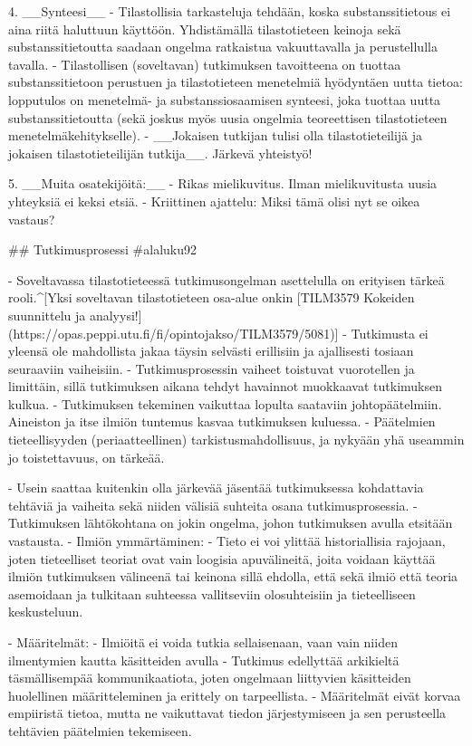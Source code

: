 \documentclass[
]{book}
\begin{document}
\begin{itemize}
4. __Synteesi__
  - Tilastollisia tarkasteluja tehdään, koska substanssitietous ei aina riitä haluttuun käyttöön. Yhdistämällä tilastotieteen keinoja sekä substanssitietoutta saadaan ongelma ratkaistua vakuuttavalla ja perustellulla tavalla.
  - Tilastollisen (soveltavan) tutkimuksen tavoitteena on tuottaa substanssitietoon perustuen ja tilastotieteen menetelmiä hyödyntäen uutta tietoa: lopputulos on menetelmä- ja substanssiosaamisen synteesi, joka tuottaa uutta substanssitietoutta (sekä joskus myös uusia ongelmia teoreettisen tilastotieteen menetelmäkehitykselle).
  - __Jokaisen tutkijan tulisi olla tilastotieteilijä ja jokaisen tilastotieteilijän tutkija__. Järkevä yhteistyö!

5. __Muita osatekijöitä:__
  - Rikas mielikuvitus. Ilman mielikuvitusta uusia yhteyksiä ei keksi etsiä.
  - Kriittinen ajattelu: Miksi tämä olisi nyt se oikea vastaus?

## Tutkimusprosessi {#alaluku92}

- Soveltavassa tilastotieteessä tutkimusongelman asettelulla on erityisen tärkeä rooli.^[Yksi soveltavan tilastotieteen osa-alue onkin [TILM3579 Kokeiden suunnittelu ja analyysi!](https://opas.peppi.utu.fi/fi/opintojakso/TILM3579/5081)] 
- Tutkimusta ei yleensä ole mahdollista jakaa täysin selvästi erillisiin ja ajallisesti tosiaan seuraaviin vaiheisiin.
  - Tutkimusprosessin vaiheet toistuvat vuorotellen ja limittäin, sillä tutkimuksen aikana tehdyt havainnot muokkaavat tutkimuksen kulkua.
  - Tutkimuksen tekeminen vaikuttaa lopulta saataviin johtopäätelmiin. Aineiston ja itse ilmiön tuntemus kasvaa tutkimuksen kuluessa.
  - Päätelmien tieteellisyyden (periaatteellinen) tarkistusmahdollisuus, ja nykyään yhä useammin jo toistettavuus, on tärkeää.

- Usein saattaa kuitenkin olla järkevää jäsentää tutkimuksessa kohdattavia tehtäviä ja vaiheita sekä niiden välisiä suhteita osana tutkimusprosessia.
  - Tutkimuksen lähtökohtana on jokin ongelma, johon tutkimuksen avulla etsitään vastausta.
  - Ilmiön ymmärtäminen: 
  - Tieto ei voi ylittää historiallisia rajojaan, joten tieteelliset teoriat ovat vain loogisia apuvälineitä, joita voidaan käyttää ilmiön tutkimuksen välineenä tai keinona sillä ehdolla, että sekä ilmiö että teoria asemoidaan ja tulkitaan suhteessa vallitseviin olosuhteisiin ja tieteelliseen keskusteluun.

- Määritelmät:
  - Ilmiöitä ei voida tutkia sellaisenaan, vaan vain niiden ilmentymien kautta käsitteiden avulla
  - Tutkimus edellyttää arkikieltä täsmällisempää kommunikaatiota, joten ongelmaan liittyvien käsitteiden huolellinen määritteleminen ja erittely on tarpeellista.
  - Määritelmät eivät korvaa empiiristä tietoa, mutta ne vaikuttavat tiedon järjestymiseen ja sen perusteella tehtävien päätelmien tekemiseen.


\end{itemize}
\end{document}
